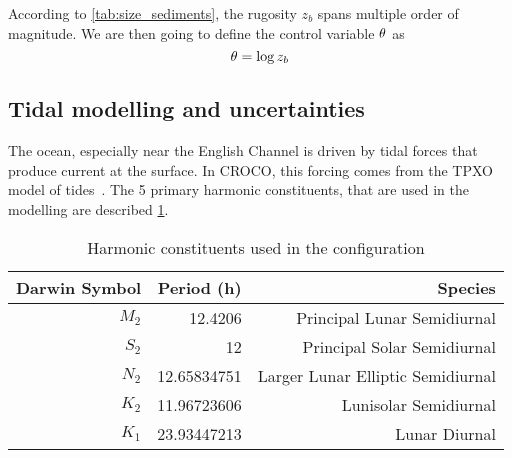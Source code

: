 \documentclass[../../Main_ManuscritThese.tex]{subfiles}
\newcommand{\CROCO}{CROCO}
\newcommand{\zob}{z_b}
\begin{document}
According to \cref{tab:size_sediments}, the rugosity $\zob$ spans
multiple order of magnitude. We are then going to define the control
variable $\theta$ as
\begin{equation}
  \kk = \log \zob
\end{equation}


\subsection{Tidal modelling and uncertainties}
\label{ssec:tidal_modelling}
The ocean, especially near the English Channel is driven by tidal
forces that produce current at the surface. In \CROCO, this forcing comes
from the TPXO model of tides~\cite{egbert_efficient_2002}. The 5
primary harmonic constituents, that are used in the modelling are
described \cref{tab:tides_components}.
\begin{table}[!h]
  \centering
  \begin{tabular}{rrr}\toprule
    Darwin Symbol & Period (h)   & Species                           \\ \midrule
    $M_2$         & 12.4206      & Principal Lunar Semidiurnal       \\
    $S_2$         & 12           & Principal Solar Semidiurnal       \\
    $N_2$         & 12.65834751  & Larger Lunar Elliptic Semidiurnal \\
    $K_2$         & 11.96723606  & Lunisolar Semidiurnal             \\
    $K_1$         & 23.93447213  & Lunar Diurnal                     \\
    \bottomrule
  \end{tabular}
  \caption{Harmonic constituents used in the configuration}
  \label{tab:tides_components}
\end{table}
\end{document}
